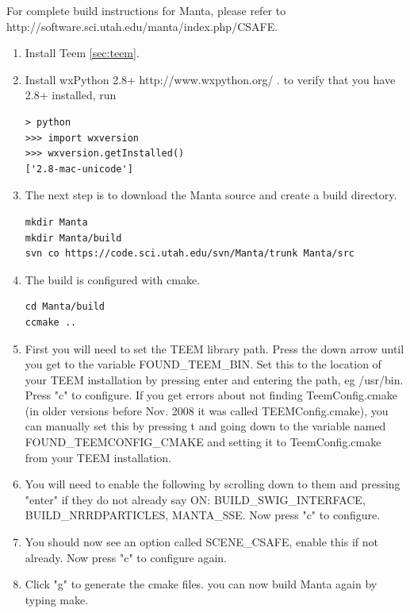 \documentclass[12pt]{report}
\begin{document}
For complete build instructions for Manta, please refer to
http://software.sci.utah.edu/manta/index.php/CSAFE.  

\begin{enumerate}
\item
Install Teem \ref{sec:teem}.
\item
Install wxPython 2.8+ http://www.wxpython.org/ .  
to verify that you have 2.8+ installed, run
\begin{Verbatim}
> python
>>> import wxversion
>>> wxversion.getInstalled()
['2.8-mac-unicode']
\end{Verbatim}
\item
The next step is to download the Manta source and create a build directory.
\begin{Verbatim}
mkdir Manta
mkdir Manta/build
svn co https://code.sci.utah.edu/svn/Manta/trunk Manta/src
\end{Verbatim}
\item
The build is configured with cmake.
\begin{Verbatim}
cd Manta/build
ccmake ..
\end{Verbatim}
\item
 First you will need to set the TEEM library path. Press the down arrow until you get to the variable FOUND\_TEEM\_BIN. Set this to the location of your TEEM installation by pressing enter and entering the path, eg /usr/bin. Press "c" to configure. If you get errors about not finding TeemConfig.cmake (in older versions before Nov. 2008 it was called TEEMConfig.cmake), you can manually set this by pressing t and going down to the variable named FOUND\_TEEMCONFIG\_CMAKE and setting it to TeemConfig.cmake from your TEEM installation. 
 \item
 You will need to enable the following by scrolling down to them and pressing "enter" if they do not already say ON: BUILD\_SWIG\_INTERFACE, BUILD\_NRRDPARTICLES, MANTA\_SSE. Now press "c" to configure. 
 \item
 You should now see an option called SCENE\_CSAFE, enable this if not already. Now press "c" to configure again. 
 \item
 Click "g" to generate the cmake files. you can now build Manta again by typing make. 
\end{enumerate}
\end{document}
